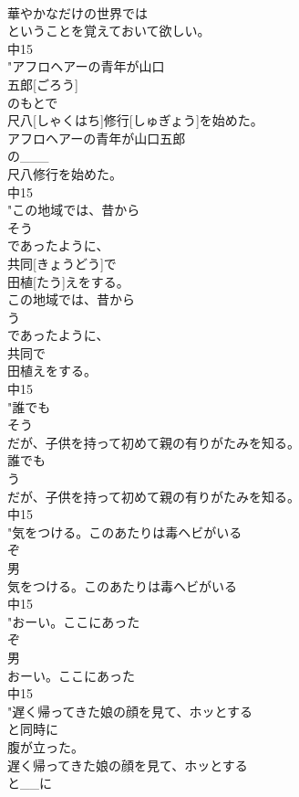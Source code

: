 \documentclass[8pt]{extreport}
\begin{document}
\begin{CJK}{UTF8}{min}
\\	華やかなだけの世界では
\\	ということを覚えておいて欲しい。
\\	中15
\\	"アフロヘアーの青年が山口
\\	五郎[ごろう]
\\	のもとで
\\	尺八[しゃくはち]修行[しゅぎょう]を始めた。
\\	アフロヘアーの青年が山口五郎
\\	の___
\\	尺八修行を始めた。
\\	中15
\\	"この地域では、昔から
\\	そう
\\	であったように、
\\	共同[きょうどう]で
\\	田植[たう]えをする。
\\	この地域では、昔から
\\	う
\\	であったように、
\\	共同で
\\	田植えをする。
\\	中15
\\	"誰でも
\\	そう
\\	だが、子供を持って初めて親の有りがたみを知る。
\\	誰でも
\\	う
\\	だが、子供を持って初めて親の有りがたみを知る。
\\	中15
\\	"気をつける。このあたりは毒ヘビがいる
\\	ぞ
\\	男 
\\	気をつける。このあたりは毒ヘビがいる
\\	中15
\\	"おーい。ここにあった
\\	ぞ
\\	男 
\\	おーい。ここにあった
\\	中15
\\	"遅く帰ってきた娘の顔を見て、ホッとする
\\	と同時に
\\	腹が立った。
\\	遅く帰ってきた娘の顔を見て、ホッとする
\\	と__に

\end{CJK}
\end{document}
